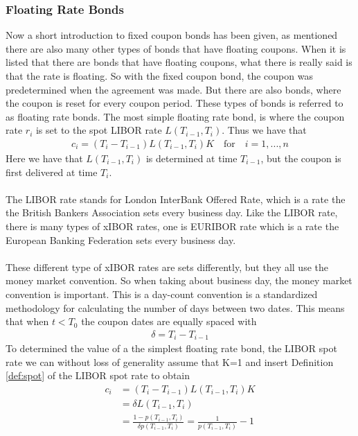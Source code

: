 \subsubsection{Floating Rate Bonds}
Now a short introduction to fixed coupon bonds has been given, as mentioned there are also many 
other types of bonds that have floating coupons. When it is listed that there are bonds that have
floating coupons, what there is really said is that the rate is floating. So with the fixed coupon
bond, the coupon was predetermined when the agreement was made. But there are also bonds, where
the coupon is reset for every coupon period. These types of bonds is referred to as floating 
rate bonds. The most simple floating rate bond, is where the coupon rate $r_i$ is set to 
the spot LIBOR rate $L(T_{i-1}, T_i)$. Thus we have that 
\begin{align*}
    c_i = (T_i-T_{i-1})L(T_{i-1},T_i)K \quad \text{for} \quad i=1,...,n
\end{align*}
Here we have that $L(T_{i-1},T_i)$ is determined at time $T_{i-1}$, but the coupon is first 
delivered at time $T_i$. \cite{Bjork}  
\\\\
The LIBOR rate stands for London InterBank Offered Rate, which is a rate the the 
British Bankers Association sets every business day. Like the LIBOR rate, there is many types
of xIBOR rates, one is EURIBOR rate which is a rate the 
European Banking Federation sets every business day. 
\\\\
These different type of xIBOR rates are sets differently, but they all use the money market convention. 
So when taking about business day, the money market convention is important. This is a day-count 
convention is a standardized methodology for calculating the number of days between two dates.
This means that when $t <T_0$  the coupon dates are equally spaced with  
\begin{align*}
    \delta = T_{i}-T_{i-1}
\end{align*}
To determined the value of a the simplest floating rate bond, the LIBOR spot rate we can without
loss of generality assume that K=1 and insert Definition \ref{def:spot} of the LIBOR spot rate 
to obtain
\begin{align*}
    c_i &= (T_i-T_{i-1})L(T_{i-1},T_i)K \\
        &= \delta L(T_{i-1},T_i) \\
        &= \frac{1- p(T_{i-1},T_i)}{\delta p(T_{i-1},T_i)} = \frac{1}{p(T_{i-1},T_i)}-1
\end{align*}
